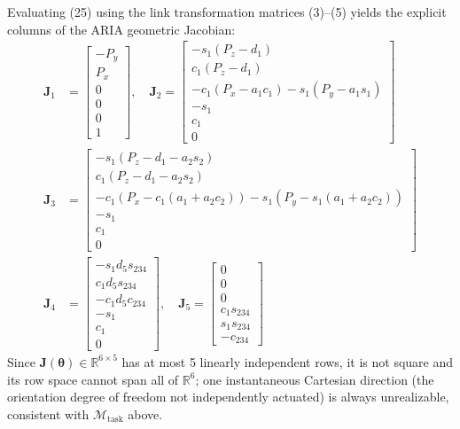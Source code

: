 \documentclass[journal]{IEEEtran}
\begin{document}
Evaluating (25) using the link transformation matrices (3)–(5) yields the explicit columns of the ARIA geometric Jacobian:
\begin{align}
\mathbf{J}_1 &= \begin{bmatrix} -P_y \\ P_x \\ 0 \\ 0 \\ 0 \\ 1 \end{bmatrix}, \quad
\mathbf{J}_2 = \begin{bmatrix} -s_1 (P_z - d_1) \\ c_1 (P_z - d_1) \\ -c_1 (P_x - a_1 c_1) - s_1 (P_y - a_1 s_1) \\ -s_1 \\ c_1 \\ 0 \end{bmatrix} \\
\mathbf{J}_3 &= \begin{bmatrix} -s_1 (P_z - d_1 - a_2 s_2) \\ c_1 (P_z - d_1 - a_2 s_2) \\ -c_1 (P_x - c_1(a_1 + a_2 c_2)) - s_1 (P_y - s_1(a_1 + a_2 c_2)) \\ -s_1 \\ c_1 \\ 0 \end{bmatrix} \\
\mathbf{J}_4 &= \begin{bmatrix} -s_1 d_5 s_{234} \\ c_1 d_5 s_{234} \\ -c_1 d_5 c_{234} \\ -s_1 \\ c_1 \\ 0 \end{bmatrix}, \quad
\mathbf{J}_5 = \begin{bmatrix} 0 \\ 0 \\ 0 \\ c_1 s_{234} \\ s_1 s_{234} \\ -c_{234} \end{bmatrix}
\end{align}
Since $\mathbf{J}(\boldsymbol{\theta}) \in \mathbb{R}^{6\times5}$ has at most 5 linearly independent rows, it is not square and its row space cannot span all of $\mathbb{R}^6$; one instantaneous Cartesian direction (the orientation degree of freedom not independently actuated) is always unrealizable, consistent with $\mathcal{M}_{\text{task}}$ above.
\end{document}
